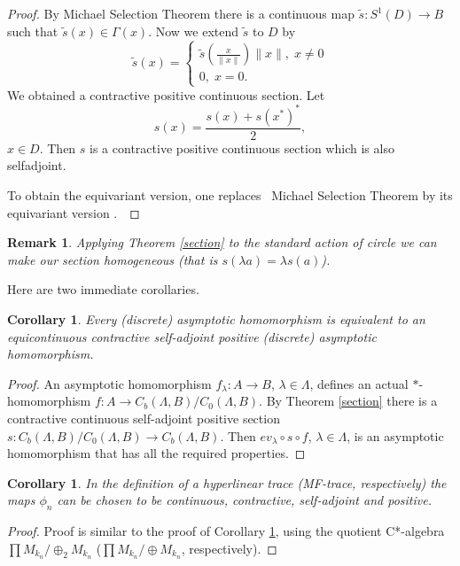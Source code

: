 \documentclass{article}%
\newtheorem{corollary}[theorem]{Corollary}
\newtheorem{remark}[theorem]{Remark}
\begin{document}
\begin{proof}
By  Michael Selection Theorem there is a continuous map $\tilde s:  S^1(D)\to B$ such that $\tilde s(x) \in \Gamma(x)$. Now we extend $\tilde s$ to $D$ by
$$\tilde s(x) = \begin{cases} \tilde s \left(\frac{x}{\|x\|}\right) \|x\|, \; x\neq 0\\0, \; x=0.\end{cases}$$
We obtained a contractive positive continuous section. Let $$s(x) = \frac{s(x)+s(x^*)^*}{2}, $$ $x\in D$. Then $s$ is a contractive positive continuous section which is also selfadjoint.


To obtain the equivariant version, one replaces  Michael Selection Theorem by its equivariant version \cite[Th. 3.4]{EquivariantSelection}. 
\end{proof}

\begin{remark} Applying Theorem \ref{section} to the standard action of circle  we can make our section homogeneous  (that is $s(\lambda a) = \lambda s(a)$).
\end{remark}



Here  are two immediate corollaries.

\begin{corollary}\label{asHomRquivContr} Every (discrete) asymptotic homomorphism is equivalent to an equicontinuous contractive self-adjoint positive (discrete) asymptotic homomorphism.
\end{corollary}
\begin{proof} An asymptotic homomorphism  $f_{\lambda}: A \to B$, $\lambda\in \Lambda$,   defines an actual $\ast$-homomorphism $f: A \to C_b(\Lambda, B)/C_0(\Lambda, B)$. By Theorem \ref{section} there is a contractive continuous self-adjoint positive section $s: C_b(\Lambda, B)/C_0(\Lambda, B) \to C_b(\Lambda, B)$. Then $ev_{\lambda}\circ s\circ f$, $\lambda\in \Lambda$, is an asymptotic homomorphism that  has all the required properties.
\end{proof}

\begin{corollary} In the definition of a hyperlinear trace (MF-trace, respectively) the maps $\phi_n$ can be chosen to be continuous, contractive, self-adjoint and positive.
\end{corollary}
\begin{proof} Proof is similar to the proof of  Corollary \ref{asHomRquivContr}, using the  quotient C*-algebra $\prod M_{k_n}/\oplus_2 M_{k_n}$ ($\prod M_{k_n}/\oplus M_{k_n}$, respectively).
\end{proof}
\end{document}
